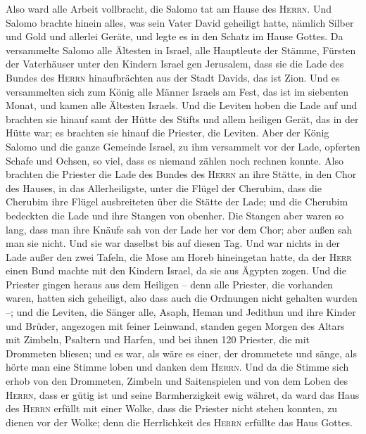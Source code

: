  Also ward alle Arbeit vollbracht, die Salomo tat am Hause
des \textsc{Herrn}. Und Salomo brachte hinein alles, was sein Vater
David geheiligt hatte, nämlich Silber und Gold und allerlei Geräte, und
legte es in den Schatz im Hause Gottes.  Da versammelte
Salomo alle Ältesten in Israel, alle Hauptleute der Stämme, Fürsten der
Vaterhäuser unter den Kindern Israel gen Jerusalem, dass sie die Lade
des Bundes des \textsc{Herrn} hinaufbrächten aus der Stadt Davids, das
ist Zion.  Und es versammelten sich zum König alle Männer
Israels am Fest, das ist im siebenten Monat,  und kamen
alle Ältesten Israels. Und die Leviten hoben die Lade auf 
und brachten sie hinauf samt der Hütte des Stifts und allem heiligen
Gerät, das in der Hütte war; es brachten sie hinauf die Priester, die
Leviten.  Aber der König Salomo und die ganze Gemeinde
Israel, zu ihm versammelt vor der Lade, opferten Schafe und Ochsen, so
viel, dass es niemand zählen noch rechnen konnte.  Also
brachten die Priester die Lade des Bundes des \textsc{Herrn} an ihre
Stätte, in den Chor des Hauses, in das Allerheiligste, unter die Flügel
der Cherubim,  dass die Cherubim ihre Flügel ausbreiteten
über die Stätte der Lade; und die Cherubim bedeckten die Lade und ihre
Stangen von obenher.  Die Stangen aber waren so lang, dass
man ihre Knäufe sah von der Lade her vor dem Chor; aber außen sah man
sie nicht. Und sie war daselbst bis auf diesen Tag.  Und
war nichts in der Lade außer den zwei Tafeln, die Mose am Horeb
hineingetan hatte, da der \textsc{Herr} einen Bund machte mit den
Kindern Israel, da sie aus Ägypten zogen.  Und die
Priester gingen heraus aus dem Heiligen -- denn alle Priester, die
vorhanden waren, hatten sich geheiligt, also dass auch die Ordnungen
nicht gehalten wurden --;  und die Leviten, die Sänger
alle, Asaph, Heman und Jedithun und ihre Kinder und Brüder, angezogen
mit feiner Leinwand, standen gegen Morgen des Altars mit Zimbeln,
Psaltern und Harfen, und bei ihnen 120 Priester, die mit Drommeten
bliesen;  und es war, als wäre es einer, der drommetete
und sänge, als hörte man eine Stimme loben und danken dem
\textsc{Herrn}. Und da die Stimme sich erhob von den Drommeten, Zimbeln
und Saitenspielen und von dem Loben des \textsc{Herrn}, dass er gütig
ist und seine Barmherzigkeit ewig währet, da ward das Haus des
\textsc{Herrn} erfüllt mit einer Wolke,  dass die
Priester nicht stehen konnten, zu dienen vor der Wolke; denn die
Herrlichkeit des \textsc{Herrn} erfüllte das Haus Gottes.

